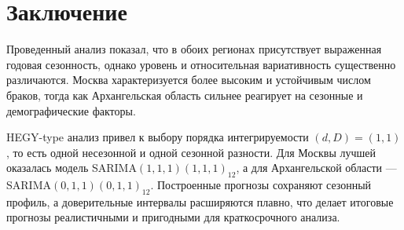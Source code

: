 \documentclass[12pt]{article}
\begin{document}
\section{Заключение}
Проведенный анализ показал, что в обоих регионах присутствует выраженная годовая
сезонность, однако уровень и относительная вариативность существенно различаются.
Москва характеризуется более высоким и устойчивым числом браков, тогда как
Архангельская область сильнее реагирует на сезонные и демографические факторы.

HEGY-type анализ привел к выбору порядка интегрируемости \((d,D)=(1,1)\), то
есть одной несезонной и одной сезонной разности. Для Москвы лучшей оказалась
модель SARIMA$(1,1,1)(1,1,1)_{12}$, а для Архангельской области ---
SARIMA$(0,1,1)(0,1,1)_{12}$. Построенные прогнозы сохраняют сезонный профиль, а
доверительные интервалы расширяются плавно, что делает итоговые прогнозы
реалистичными и пригодными для краткосрочного анализа.
\end{document}

